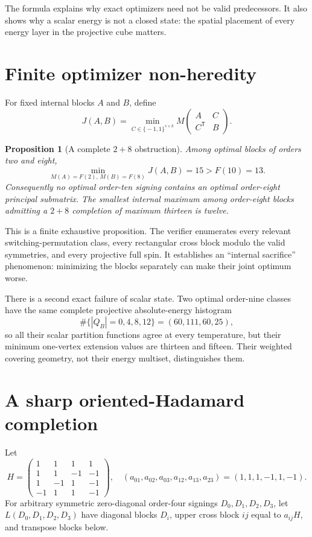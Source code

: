 \documentclass[11pt]{article}
\newcommand{\eps}{\{\!-1,1\!\}}
\newcommand{\T}{\mathsf T}
\newtheorem{proposition}[theorem]{Proposition}
\theoremstyle{remark}
\begin{document}
The formula explains why exact optimizers need not be valid predecessors.
It also shows why a scalar energy is not a closed state: the spatial
placement of every energy layer in the projective cube matters.

\section{Finite optimizer non-heredity}

For fixed internal blocks $A$ and $B$, define
\[
 J(A,B)=\min_{C\in\eps^{s\times k}}
 M\begin{pmatrix}A&C\\C^{\T}&B\end{pmatrix}.
\]

\begin{proposition}[A complete $2+8$ obstruction]
Among optimal blocks of orders two and eight,
\[
 \min_{M(A)=F(2),\,M(B)=F(8)}J(A,B)=15>F(10)=13.
\]
Consequently no optimal order-ten signing contains an optimal order-eight
principal submatrix.  The smallest internal maximum among order-eight blocks
admitting a $2+8$ completion of maximum thirteen is twelve.
\end{proposition}

This is a finite exhaustive proposition.  The verifier enumerates every
relevant switching-permutation class, every rectangular cross block modulo
the valid symmetries, and every projective full spin.  It establishes an
``internal sacrifice'' phenomenon: minimizing the blocks separately can make
their joint optimum worse.

There is a second exact failure of scalar state.  Two optimal order-nine
classes have the same complete projective absolute-energy histogram
\[
 \#\{|Q_B|=0,4,8,12\}=(60,111,60,25),
\]
so all their scalar partition functions agree at every temperature, but their
minimum one-vertex extension values are thirteen and fifteen.  Their weighted
covering geometry, not their energy multiset, distinguishes them.

\section{A sharp oriented-Hadamard completion}

Let
\[
H=\begin{pmatrix}
1&1&1&1\\1&1&-1&-1\\1&-1&1&-1\\-1&1&1&-1
\end{pmatrix},
\quad
(a_{01},a_{02},a_{03},a_{12},a_{13},a_{23})
=(1,1,1,-1,1,-1).
\]
For arbitrary symmetric zero-diagonal order-four signings
$D_0,D_1,D_2,D_3$, let $L(D_0,D_1,D_2,D_3)$ have diagonal blocks $D_i$,
upper cross block $ij$ equal to $a_{ij}H$, and transpose blocks below.
\end{document}
